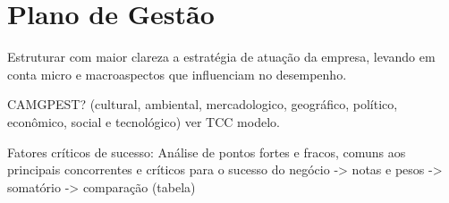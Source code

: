 \section{Plano de Gestão}

Estruturar com maior clareza a estratégia de atuação da empresa, levando em conta
micro e macroaspectos que influenciam no desempenho.

CAMGPEST? (cultural, ambiental, mercadologico, geográfico, político, econômico, social
e tecnológico) ver TCC modelo.

Fatores críticos de sucesso:
Análise de pontos fortes e fracos, comuns aos principais concorrentes e críticos para
o sucesso do negócio -> notas e pesos -> somatório -> comparação (tabela)
